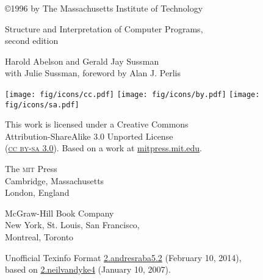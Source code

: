 \documentclass[8pt,oneside]{book}
\newcommand{\acronym}[1]{\textsc{\MakeLowercase{#1}}}
\begin{document}
\VerbatimFootnotes

\frontmatter



\pagebreak

\vspace*{\fill}
\thispagestyle{empty}

\begin{small}

\noindent
{\copyright}1996 by The Massachusetts Institute of Technology

\vspace{1.26em}
\noindent
Structure and Interpretation of Computer Programs,\\
second edition

\vspace{1.26em}
\noindent
Harold Abelson and Gerald Jay Sussman\\
with Julie Sussman, foreword by Alan J. Perlis

\vspace{1.6em}
\noindent
\texttt{[image: fig/icons/cc.pdf]}
\texttt{[image: fig/icons/by.pdf]}
\texttt{[image: fig/icons/sa.pdf]}

\vspace{0.4em}
\noindent
This work is licensed under a Creative Commons\\ 
Attribution-ShareAlike 3.0 Unported License\\
(\href{http://creativecommons.org/licenses/by-sa/3.0/}{\acronym{CC BY-SA} 3.0}).
Based on a work at \href{http://mitpress.mit.edu/sicp/}{mitpress.mit.edu}.

\vspace{1.26em}
\noindent
The \acronym{MIT} Press\\
Cambridge, Massachusetts\\ 
London, England

\vspace{1.26em}
\noindent
McGraw-Hill Book Company\\
New York, St. Louis, San Francisco,\\ 
Montreal, Toronto

\vspace{1.26em}
\noindent
Unofficial Texinfo Format \href{http://sicpebook.wordpress.com}{2.andresraba5.2} (February 10, 2014),\\ 
based on \href{http://www.neilvandyke.org/sicp-texi/}{2.neilvandyke4} (January 10, 2007).

\end{small}
\end{document}
